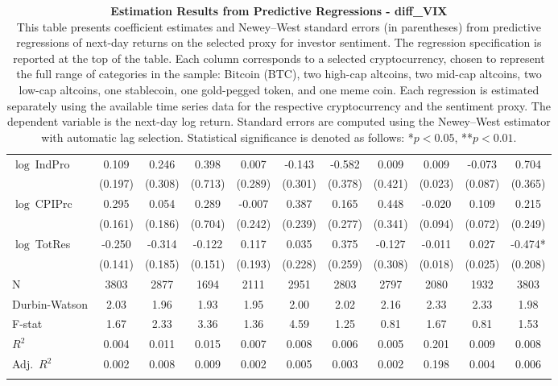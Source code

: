 \begin{table}[ht]
\begin{tabular}{l *{10}{c}}
\addlinespace
$\log\ $IndPro & 0.109 & 0.246 & 0.398 & 0.007 & -0.143 & -0.582 & 0.009 & 0.009 & -0.073 & 0.704 \\
 & (0.197) & (0.308) & (0.713) & (0.289) & (0.301) & (0.378) & (0.421) & (0.023) & (0.087) & (0.365) \\
\addlinespace
$\log\ $CPIPrc & 0.295 & 0.054 & 0.289 & -0.007 & 0.387 & 0.165 & 0.448 & -0.020 & 0.109 & 0.215 \\
 & (0.161) & (0.186) & (0.704) & (0.242) & (0.239) & (0.277) & (0.341) & (0.094) & (0.072) & (0.249) \\
\addlinespace
$\log\ $TotRes & -0.250 & -0.314 & -0.122 & 0.117 & 0.035 & 0.375 & -0.127 & -0.011 & 0.027 & -0.474* \\
 & (0.141) & (0.185) & (0.151) & (0.193) & (0.228) & (0.259) & (0.308) & (0.018) & (0.025) & (0.208) \\
\addlinespace
\midrule
N & 3803 & 2877 & 1694 & 2111 & 2951 & 2803 & 2797 & 2080 & 1932 & 3803 \\
Durbin-Watson & 2.03 & 1.96 & 1.93 & 1.95 & 2.00 & 2.02 & 2.16 & 2.33 & 2.33 & 1.98 \\
F-stat & 1.67 & 2.33 & 3.36 & 1.36 & 4.59 & 1.25 & 0.81 & 1.67 & 0.81 & 1.53 \\
\(R^2\) & 0.004 & 0.011 & 0.015 & 0.007 & 0.008 & 0.006 & 0.005 & 0.201 & 0.009 & 0.008 \\
Adj.\ \(R^2\) & 0.002 & 0.008 & 0.009 & 0.002 & 0.005 & 0.003 & 0.002 & 0.198 & 0.004 & 0.006 \\
\addlinespace
\midrule
\multicolumn{11}{c}{Specification tested: $R_{i,t+1} = \alpha_i + \beta_{sent} S_t + \phi R_{i,t} + \theta B_{i,t} + \gamma M_t + \varepsilon_{i,t+1}$}\\
\bottomrule
\end{tabular}
\caption{\textbf{Estimation Results from Predictive Regressions - diff_VIX} \\
This table presents coefficient estimates and Newey--West standard errors (in parentheses) from predictive regressions of next-day returns on the selected proxy for investor sentiment. The regression specification is reported at the top of the table. Each column corresponds to a selected cryptocurrency, chosen to represent the full range of categories in the sample: Bitcoin (BTC), two high-cap altcoins, two mid-cap altcoins, two low-cap altcoins, one stablecoin, one gold-pegged token, and one meme coin. Each regression is estimated separately using the available time series data for the respective cryptocurrency and the sentiment proxy. The dependent variable is the next-day log return. Standard errors are computed using the Newey--West estimator with automatic lag selection. Statistical significance is denoted as follows: *$p<0.05$, **$p<0.01$.}
\label{tab:diff_vix_result_h1}
\end{table}
